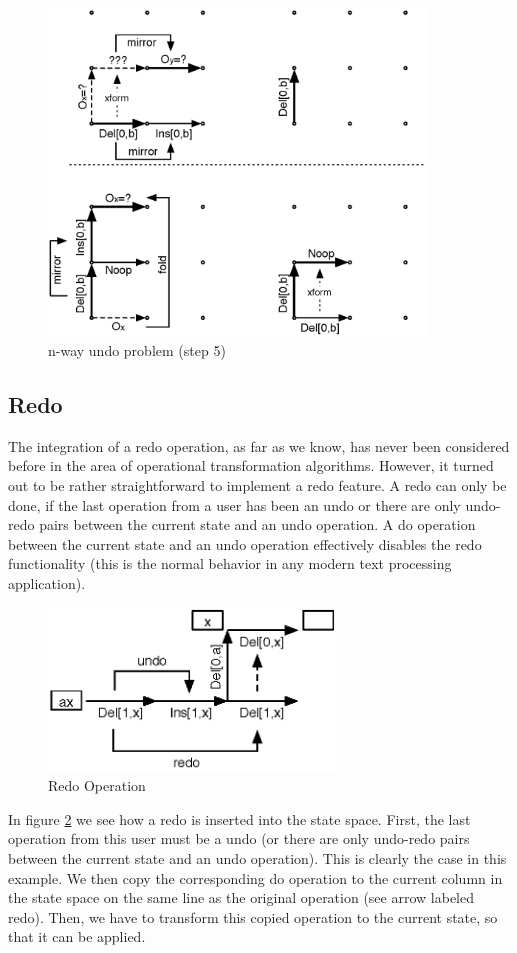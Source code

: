 \begin{figure}[H]
 \centering
 \includegraphics[width=10cm,height=8.69cm]{../../images/concepts_transformation-history-5.eps}
 \caption{n-way undo problem (step 5)}
 \label{fig:concepts.transformation-history-5}
\end{figure}


\subsection{Redo}
The integration of a redo operation, as far as we know, has never been considered before in the area of operational transformation algorithms. However, it turned out to be rather straightforward to implement a redo feature. A redo can only be done, if the last operation from a user has been an undo or there are only undo-redo pairs between the current state and an undo operation. A do operation between the current state and an undo operation effectively disables the redo functionality (this is the normal behavior in any modern text processing application).

\begin{figure}[htb]
 \centering
 \includegraphics[width=7.62cm,height=4.34cm]{../../images/concepts_redo.eps}
 \caption{Redo Operation}
 \label{fig:concepts.redo}
\end{figure}

In figure \ref{fig:concepts.redo} we see how a redo is inserted into the state space. First, the last operation from this user must be a undo (or there are only undo-redo pairs between the current state and an undo operation). This is clearly the case in this example. We then copy the corresponding do operation to the current column in the state space on the same line as the original operation (see arrow labeled redo). Then, we have to transform this copied operation to the current state, so that it can be applied. 
